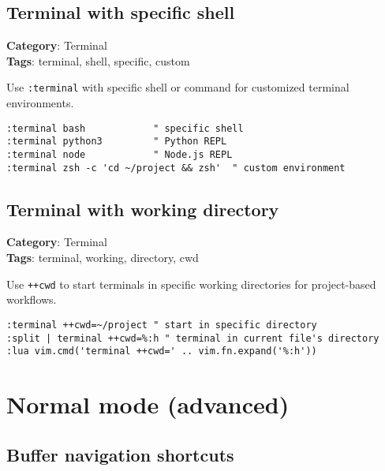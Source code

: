 {{{{{{{{{{\section{Terminal with specific shell}

\textbf{Category}: Terminal\\ \textbf{Tags}: terminal, shell, specific, custom
\vspace{0.5cm}

Use {\footnotesize \Verb§:terminal§} with specific shell or command for customized terminal environments.

\begin{Exa*}{}
\begin{Verbatim}[fontsize=\footnotesize, breaklines, breakanywhere]
:terminal bash            " specific shell
:terminal python3         " Python REPL
:terminal node            " Node.js REPL
:terminal zsh -c 'cd ~/project && zsh'  " custom environment
\end{Verbatim}
\end{Exa*}

\section{Terminal with working directory}

\textbf{Category}: Terminal\\ \textbf{Tags}: terminal, working, directory, cwd
\vspace{0.5cm}

Use {\footnotesize \Verb§++cwd§} to start terminals in specific working directories for project-based workflows.

\begin{Exa*}{}
\begin{Verbatim}[fontsize=\footnotesize, breaklines, breakanywhere]
:terminal ++cwd=~/project " start in specific directory
:split | terminal ++cwd=%:h " terminal in current file's directory
:lua vim.cmd('terminal ++cwd=' .. vim.fn.expand('%:h'))
\end{Verbatim}
\end{Exa*}

\chapter{Normal mode (advanced)}
\section{Buffer navigation shortcuts}

}}}}}}}}}}
